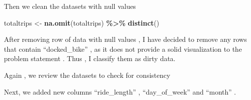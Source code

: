 \documentclass[
]{article}
\newenvironment{Shaded}{\begin{snugshade}}{\end{snugshade}}
\newcommand{\AttributeTok}[1]{\textcolor[rgb]{0.13,0.29,0.53}{#1}}
\newcommand{\FunctionTok}[1]{\textcolor[rgb]{0.13,0.29,0.53}{\textbf{#1}}}
\newcommand{\NormalTok}[1]{#1}
\newcommand{\OtherTok}[1]{\textcolor[rgb]{0.56,0.35,0.01}{#1}}
\newcommand{\SpecialCharTok}[1]{\textcolor[rgb]{0.81,0.36,0.00}{\textbf{#1}}}
\newcommand{\StringTok}[1]{\textcolor[rgb]{0.31,0.60,0.02}{#1}}
\begin{document}
Then we clean the datasets with null values

\begin{Shaded}
\begin{Highlighting}[]
\NormalTok{totaltrips }\OtherTok{\textless{}{-}} \FunctionTok{na.omit}\NormalTok{(totaltrips) }\SpecialCharTok{\%\textgreater{}\%} \FunctionTok{distinct}\NormalTok{()}
\end{Highlighting}
\end{Shaded}

After removing row of data with null values , I have decided to remove
any rows that contain ``docked\_bike'' , as it does not provide a solid
visualization to the problem statement . Thus , I classify them as dirty
data.

\begin{Shaded}
\end{Shaded}

Again , we review the datasets to check for consistency

Next, we added new columns ``ride\_length'' , ``day\_of\_week'' and
``month'' .

\begin{Shaded}
\end{Shaded}
\end{document}
